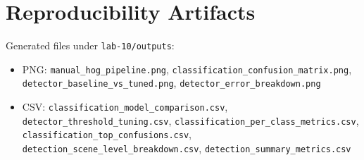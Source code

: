 \documentclass[12pt,a4paper]{article}
\begin{document}
\section{Reproducibility Artifacts}
Generated files under \texttt{lab-10/outputs}:
\begin{itemize}
    \item PNG: \texttt{manual\_hog\_pipeline.png}, \texttt{classification\_confusion\_matrix.png}, \texttt{detector\_baseline\_vs\_tuned.png}, \texttt{detector\_error\_breakdown.png}
    \item CSV: \texttt{classification\_model\_comparison.csv}, \texttt{detector\_threshold\_tuning.csv}, \texttt{classification\_per\_class\_metrics.csv}, \texttt{classification\_top\_confusions.csv}, \texttt{detection\_scene\_level\_breakdown.csv}, \texttt{detection\_summary\_metrics.csv}
\end{itemize}
\end{document}
